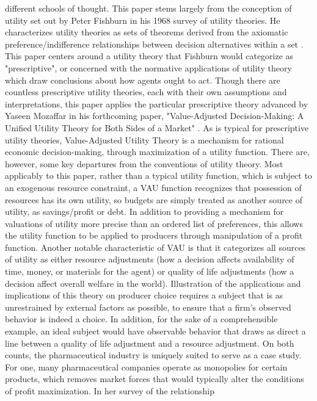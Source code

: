 \documentclass[12pt,english]{article} \usepackage{mathptmx}
\begin{document}
different schools of thought. This paper stems largely from the 
conception of utility set out by Peter Fishburn in his 1968 survey of 
utility theories. He characterizes utility theories as sets of theorems 
derived from the axiomatic preference/indifference relationships between 
decision alternatives within a set \cite{fishburn68}. This paper centers 
around a utility theory that Fishburn would categorize as 
"prescriptive", or concerned with the normative applications of utility 
theory which draw conclusions about how agents ought to act. Though 
there are countless prescriptive utility theories, each with their own 
assumptions and interpretations, this paper applies the particular 
prescriptive theory advanced by Yaseen Mozaffar in his forthcoming 
paper, "Value-Adjusted Decision-Making: A Unified Utility Theory for 
Both Sides of a Market" \cite{mozaffar20}. As is typical for 
prescriptive utility theories, Value-Adjusted Utility Theory is a 
mechanism for rational economic decision-making, through maximization of 
a utility function. There are, however, some key departures from the 
conventions of utility theory. Most applicably to this paper, rather 
than a typical utility function, which is subject to an exogenous 
resource constraint, a VAU function recognizes that possession of 
resources has its own utility, so budgets are simply treated as another 
source of utility, as savings/profit or debt. In addition to providing a 
mechanism for valuations of utility more precise than an ordered list of 
preferences, this allows the utility function to be applied to producers 
through manipulation of a profit function. Another notable 
characteristic of VAU is that it categorizes all sources of utility as 
either resource adjustments (how a decision affects availability of 
time, money, or materials for the agent) or quality of life adjustments 
(how a decision affect overall welfare in the world). Illustration of 
the applications and implications of this theory on producer choice 
requires a subject that is as unrestrained by external factors as 
possible, to ensure that a firm's observed behavior is indeed a choice. 
In addition, for the sake of a comprehensible example, an ideal subject 
would have observable behavior that draws as direct a line between a 
quality of life adjustment and a resource adjustment. On both counts, 
the pharmaceutical industry is uniquely suited to serve as a case study. 
For one, many pharmaceutical companies operate as monopolies for certain 
products, which removes market forces that would typically alter the 
conditions of profit maximization. In her survey of the relationship 
\end{document}
